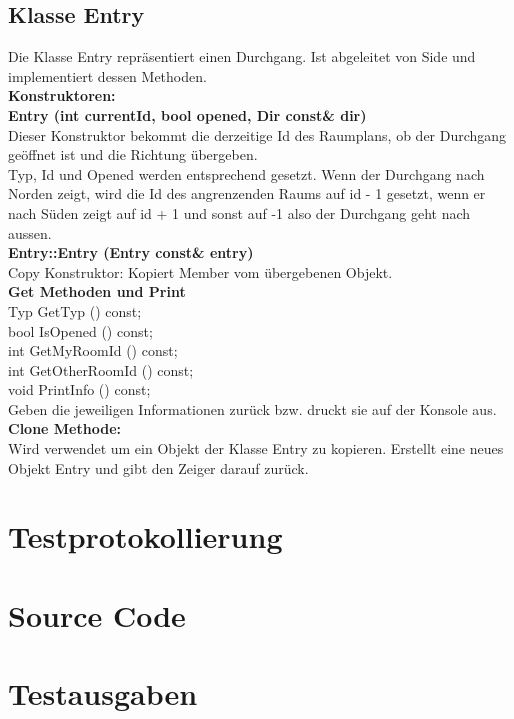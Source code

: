 \documentclass[12pt,a4paper]{article}
\begin{document}
\subsection {Klasse Entry} 
Die Klasse Entry repräsentiert einen Durchgang. Ist abgeleitet von Side und implementiert dessen Methoden. \\
\textbf {Konstruktoren:} \\
\textbf {Entry (int currentId, bool opened, Dir const\& dir)} \\
Dieser Konstruktor bekommt die derzeitige Id des Raumplans, ob der Durchgang geöffnet ist und die Richtung übergeben. \\
Typ, Id und Opened werden entsprechend gesetzt. Wenn der Durchgang nach Norden zeigt, wird die Id des angrenzenden Raums auf id - 1 gesetzt, wenn er nach Süden zeigt auf id + 1 und sonst auf -1 also der Durchgang geht nach aussen. \\
\textbf {Entry::Entry (Entry const\& entry)} \\
Copy Konstruktor: Kopiert Member vom übergebenen Objekt. \\
\textbf {Get Methoden und Print} \\
	Typ GetTyp () const; \\
	bool IsOpened () const; \\
	int GetMyRoomId () const; \\
	int GetOtherRoomId () const; \\
	void PrintInfo () const; \\
Geben die  jeweiligen Informationen zurück bzw. druckt sie auf der Konsole aus. \\
\textbf {Clone Methode:} \\
Wird verwendet um ein Objekt der Klasse Entry zu kopieren. Erstellt eine neues Objekt Entry und gibt den Zeiger darauf zurück. \\



\newpage
\section {Testprotokollierung} 


\newpage
\section {Source Code}


%
%
%
%
%
%
%
%
%
%
%
%
%
%
%





\newpage
\section {Testausgaben} 

\begin {verbatim}

\end {verbatim}
\end{document}
